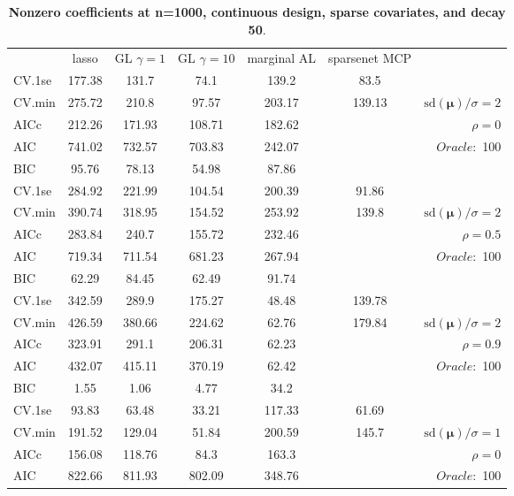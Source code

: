 \clearpage
\begin{table}\vspace{-.5cm}
\caption[l]{ { \bf Nonzero coefficients at n=1000, continuous design, 
sparse covariates, and  decay  50}.}
\vspace{-.5cm}
\footnotesize{}
\begin{center}
\begin{tabular}{l*{5}{c}|r}
& lasso & GL $\gamma=1$ & GL $\gamma=10$ & marginal AL & sparsenet MCP  & \\
 \cline{1-7}
CV.1se & 177.38 & 131.7 & 74.1 & 139.2 & 83.5 & \\
CV.min & 275.72 & 210.8 & 97.57 & 203.17 & 139.13 &  $\mathrm{sd}(\mathbf{\mu})/\sigma=2$ \\
AICc & 212.26 & 171.93 & 108.71 & 182.62 & & $\rho=0$ \\
AIC & 741.02 & 732.57 & 703.83 & 242.07 & &  \multirow{2}{*}{$Oracle: $ 100} \\
BIC & 95.76 & 78.13 & 54.98 & 87.86 & &  \\
 \hline 
CV.1se & 284.92 & 221.99 & 104.54 & 200.39 & 91.86 & \\
CV.min & 390.74 & 318.95 & 154.52 & 253.92 & 139.8 &  $\mathrm{sd}(\mathbf{\mu})/\sigma=2$ \\
AICc & 283.84 & 240.7 & 155.72 & 232.46 & & $\rho=0.5$ \\
AIC & 719.34 & 711.54 & 681.23 & 267.94 & &  \multirow{2}{*}{$Oracle: $ 100} \\
BIC & 62.29 & 84.45 & 62.49 & 91.74 & &  \\
 \hline 
CV.1se & 342.59 & 289.9 & 175.27 & 48.48 & 139.78 & \\
CV.min & 426.59 & 380.66 & 224.62 & 62.76 & 179.84 &  $\mathrm{sd}(\mathbf{\mu})/\sigma=2$ \\
AICc & 323.91 & 291.1 & 206.31 & 62.23 & & $\rho=0.9$ \\
AIC & 432.07 & 415.11 & 370.19 & 62.42 & &  \multirow{2}{*}{$Oracle: $ 100} \\
BIC & 1.55 & 1.06 & 4.77 & 34.2 & &  \\
 \hline 
CV.1se & 93.83 & 63.48 & 33.21 & 117.33 & 61.69 & \\
CV.min & 191.52 & 129.04 & 51.84 & 200.59 & 145.7 &  $\mathrm{sd}(\mathbf{\mu})/\sigma=1$ \\
AICc & 156.08 & 118.76 & 84.3 & 163.3 & & $\rho=0$ \\
AIC & 822.66 & 811.93 & 802.09 & 348.76 & &  \multirow{2}{*}{$Oracle: $ 100} \\

\end{tabular}
\end{center}
\end{table}
